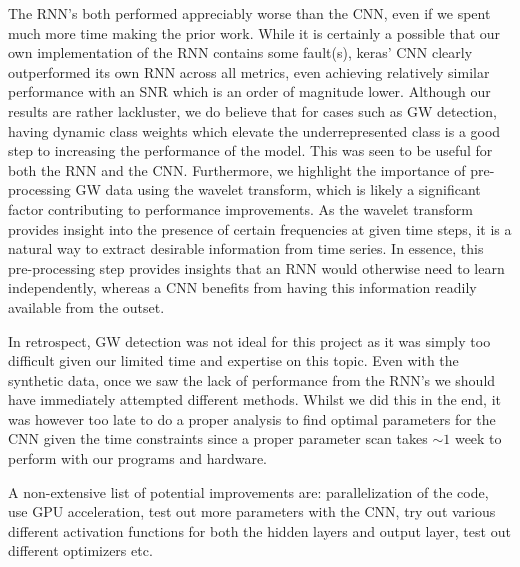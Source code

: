 \documentclass[%
reprint,
amsmath,amssymb,
aps,
]{revtex4-2}
\begin{document}
The RNN's both performed appreciably worse than the CNN, even if we spent much more time making the prior work. While it is certainly a possible that our own implementation of the RNN contains some fault(s), keras' CNN clearly outperformed its own RNN across all metrics, even achieving relatively similar performance with an SNR which is an order of magnitude lower. Although our results are rather lackluster, we do believe that for cases such as GW detection, having dynamic class weights which elevate the underrepresented class is a good step to increasing the performance of the model. This was seen to be useful for both the RNN and the CNN. Furthermore, we highlight the importance of pre-processing GW data using the wavelet transform, which is likely a significant factor contributing to performance improvements. As the wavelet transform provides insight into the presence of certain frequencies at given time steps, it is a natural way to extract desirable information from time series. In essence, this pre-processing step provides insights that an RNN would otherwise need to learn independently, whereas a CNN benefits from having this information readily available from the outset.

In retrospect, GW detection was not ideal for this project as it was simply too difficult given our limited time and expertise on this topic. Even with the synthetic data, once we saw the lack of performance from the RNN's we should have immediately attempted different methods. Whilst we did this in the end, it was however too late to do a proper analysis to find optimal parameters for the CNN given the time constraints since a proper parameter scan takes $\sim1$ week to perform with our programs and hardware.

A non-extensive list of potential improvements are: parallelization of the code, use GPU acceleration, test out more parameters with the CNN, try out various different activation functions for both the hidden layers and output layer, test out different optimizers etc.




 
\appendix

\end{document}
